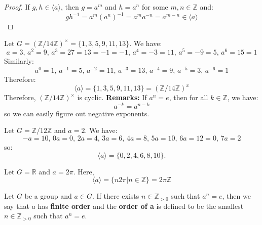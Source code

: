 \begin{itemize}
\begin{proof}
        If $g,h \in \langle a \rangle$, then $g=a^m$ and $h=a^n$ for some $m,n \in \mathbb{Z}$ and:
        \begin{equation}
            gh^{-1} = a^m(a^n)^{-1} = a^ma^{-n}=a^{m-n} \in \langle a \rangle
        \end{equation}
    \end{proof}
    \begin{example}
        Let $G = (\mathbb{Z}/14\mathbb{Z})^\times = \{1,3,5,9,11,13\}$. We have:
        \begin{equation}
            a=3,\, a^2=9,\, a^3=27=13=-1=-1,\, a^4=-3=11,\,a^5=-9=5,\,a^6=15=1
        \end{equation}
        Similarly:
        \begin{equation}
            a^0=1,\, a^{-1}=5,\, a^{-2}=11,\, a^{-3}=13,\, a^{-4}=9,\, a^{-5}=3,\, a^{-6}=1
        \end{equation}
        Therefore:
        \begin{equation}
            \langle a \rangle = \{1,3,5,9,11,13\} = (\mathbb{Z}/14\mathbb{Z})^x
        \end{equation}
        Therefore, $(\mathbb{Z}/14\mathbb{Z})^\times$ is cyclic.
        \textbf{Remarks:} If $a^n=e$, then for all $k\in \mathbb{Z}$, we have:
        \begin{equation}
            a^{-k}=a^{n-k}
        \end{equation}
        so we can easily figure out negative exponents.
    \end{example}
    \begin{example}
        Let $G=\mathbb{Z}/12\mathbb{Z}$ and $a=2$. We have:
        \begin{equation}
            -a=10,\,0a=0,\,2a=4,\,3a=6,\,4a=8,\,5a=10,\,6a=12=0,\,7a=2
        \end{equation}
        so:
        \begin{equation}
            \langle a \rangle = \{0,2,4,6,8,10\}.
        \end{equation}
    \end{example}
    \begin{example}
        Let $G=\mathbb{R}$ and $a=2\pi$. Here,
        \begin{equation}
            \langle a\rangle = \{n2\pi | n\in \mathbb{Z} \} = 2\pi \mathbb{Z}
        \end{equation}
    \end{example}
    \begin{definition}
        Let $G$ be a group and $a\in G$. If there exists $n\in \mathbb{Z}_{>0}$ such that $a^n=e$, then we say that $a$ has \textbf{finite order} and the \textbf{order of a} is defined to be the smallest $n\in \mathbb{Z}_{>0}$ such that $a^n=e$.
        \vspace{2mm}


\end{definition}
\end{itemize}
